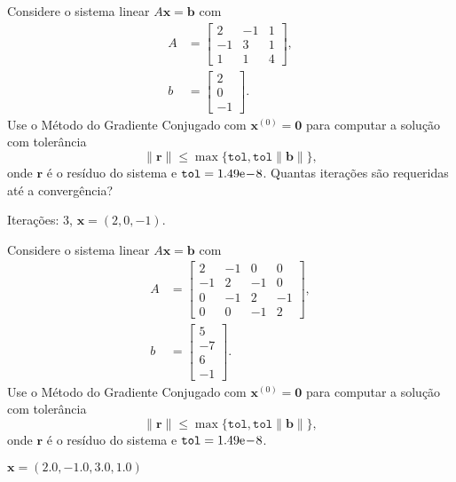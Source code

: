 \begin{exer}
  Considere o sistema linear $A\pmb{x} = \pmb{b}$ com
  \begin{align}
    A &=
    \begin{bmatrix}
      2 & -1 & 1\\
      -1 & 3 & 1\\
      1 & 1 & 4
    \end{bmatrix},\\
    b &=
    \begin{bmatrix}
      2\\
      0\\
      -1
    \end{bmatrix}.
  \end{align}
  Use o Método do Gradiente Conjugado com $\pmb{x}^{(0)} = \pmb{0}$ para computar a solução com tolerância
  \begin{equation}
    \|\pmb{r}\| \leq \max\{\texttt{tol}, \texttt{tol}\|\pmb{b}\|\},
  \end{equation}
  onde $\pmb{r}$ é o resíduo do sistema e $\texttt{tol} = 1.49\mathrm{e}\!-\!8$. Quantas iterações são requeridas até a convergência?
\end{exer}
\begin{resp}
  Iterações: 3, $\pmb{x} = (2, 0, -1)$.
\end{resp}

\begin{exer}
  Considere o sistema linear $A\pmb{x} = \pmb{b}$ com
  \begin{align}
    A &=
    \begin{bmatrix}
      2 & -1 & 0 & 0\\
      -1 & 2 & -1 & 0\\
      0 & -1 & 2 & -1 \\
      0 & 0 & -1 & 2
    \end{bmatrix},\\
    b &=
    \begin{bmatrix}
      5\\
      -7\\
      6\\
      -1
    \end{bmatrix}.
  \end{align}
  Use o Método do Gradiente Conjugado com $\pmb{x}^{(0)} = \pmb{0}$ para computar a solução com tolerância
  \begin{equation}
    \|\pmb{r}\| \leq \max\{\texttt{tol}, \texttt{tol}\|\pmb{b}\|\},
  \end{equation}
  onde $\pmb{r}$ é o resíduo do sistema e $\texttt{tol} = 1.49\mathrm{e}\!-\!8$.
\end{exer}
\begin{resp}
  $\pmb{x} = \left(2.0, -1.0, 3.0, 1.0\right)$
\end{resp}

